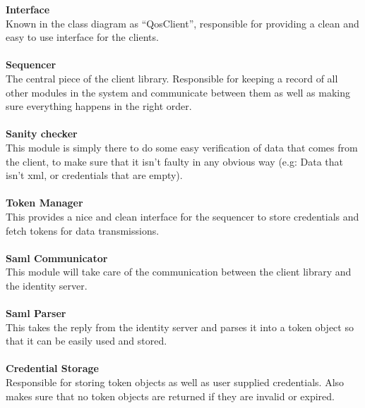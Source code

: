 		\indent \textbf{Interface} \\
Known in the class diagram as “QosClient”, responsible for providing a clean and easy to use interface for the clients.
\\\\
		\indent \textbf{Sequencer} \\
The central piece of the client library. Responsible for keeping a record of all other modules in the system and communicate between them as well as making sure everything happens in the right order.
\\\\
		\indent \textbf{Sanity checker} \\
This module is simply there to do some easy verification of data that comes from the client, to make sure that it isn’t faulty in any obvious way (e.g: Data that isn’t xml, or credentials that are empty).
\\\\
		\indent \textbf{Token Manager} \\
This provides a nice and clean interface for the sequencer to store credentials and fetch tokens for data transmissions.
\\\\
		\indent \textbf{Saml Communicator} \\
This module will take care of the communication between the client library and the identity server.
\\\\
		\indent \textbf{Saml Parser} \\
This takes the reply from the identity server and parses it into a token object so that it can be easily used and stored.
\\\\
		\indent \textbf{Credential Storage} \\
Responsible for storing token objects as well as user supplied credentials. Also makes sure that no token objects are returned if they are invalid or expired.

